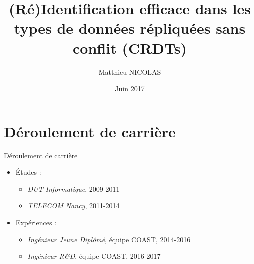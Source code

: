 \documentclass[xcolor=table]{beamer}
\author{Matthieu NICOLAS}
\title{(Ré)Identification efficace dans les types de données répliquées sans conflit (CRDTs)}
\date{Juin 2017}
\begin{document}
\begin{frame}[t,plain]
\titlepage
\end{frame}

\section{Déroulement de carrière}

%

\begin{frame}{Déroulement de carrière}
  \begin{itemize}
    \item Études :
    \begin{itemize}
      \item \emph{DUT Informatique}, 2009-2011
      \item \emph{TELECOM Nancy}, 2011-2014
    \end{itemize}
    \item Expériences :
    \begin{itemize}
      \item \emph{Ingénieur Jeune Diplômé}, équipe COAST, 2014-2016
      \item \emph{Ingénieur R\&D}, équipe COAST, 2016-2017
    \end{itemize}
  \end{itemize}
\end{frame}
\end{document}

